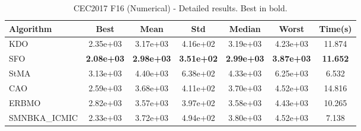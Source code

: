 \begin{table}[H]
\centering\small
\caption{CEC2017 F16 (Numerical) - Detailed results. Best in bold.}
\label{tab:cec2017_F16}
\begin{tabular}{lcccccc}
\toprule
\textbf{Algorithm} & \textbf{Best} & \textbf{Mean} & \textbf{Std} & \textbf{Median} & \textbf{Worst} & \textbf{Time(s)} \\
\midrule
KDO & 2.35e+03 & 3.17e+03 & 4.16e+02 & 3.19e+03 & 4.23e+03 & 11.874 \\
SFO & \textbf{2.08e+03} & \textbf{2.98e+03} & \textbf{3.51e+02} & \textbf{2.99e+03} & \textbf{3.87e+03} & \textbf{11.652} \\
StMA & 3.13e+03 & 4.40e+03 & 6.38e+02 & 4.33e+03 & 6.25e+03 & 6.532 \\
CAO & 2.59e+03 & 3.68e+03 & 4.11e+02 & 3.70e+03 & 4.52e+03 & 14.816 \\
ERBMO & 2.82e+03 & 3.57e+03 & 3.97e+02 & 3.58e+03 & 4.43e+03 & 10.265 \\
SMNBKA_ICMIC & 2.33e+03 & 3.72e+03 & 4.94e+02 & 3.80e+03 & 4.52e+03 & 7.138 \\
\bottomrule
\end{tabular}
\end{table}
